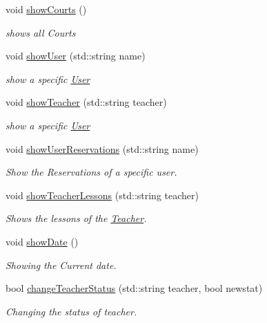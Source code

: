 \begin{DoxyCompactItemize}
void \mbox{\hyperlink{class_company_a1779c78bdc9a4416a482be25b71efcd0}{show\+Courts}} ()
\begin{DoxyCompactList}\small\item\em shows all Courts \end{DoxyCompactList}\item 
void \mbox{\hyperlink{class_company_a664aa9b9bde35eae3a564edec73cf5b3}{show\+User}} (std\+::string name)
\begin{DoxyCompactList}\small\item\em show a specific \mbox{\hyperlink{class_user}{User}} \end{DoxyCompactList}\item 
void \mbox{\hyperlink{class_company_aa64ff74648761cfe39d4a9fb0c72031f}{show\+Teacher}} (std\+::string teacher)
\begin{DoxyCompactList}\small\item\em show a specific \mbox{\hyperlink{class_user}{User}} \end{DoxyCompactList}\item 
void \mbox{\hyperlink{class_company_a428b70dbf9acd5edb34ee131ff1f8613}{show\+User\+Reservations}} (std\+::string name)
\begin{DoxyCompactList}\small\item\em Show the Reservations of a specific user. \end{DoxyCompactList}\item 
void \mbox{\hyperlink{class_company_aef95f2feab286505091c38db23cd1c90}{show\+Teacher\+Lessons}} (std\+::string teacher)
\begin{DoxyCompactList}\small\item\em Shows the lessons of the \mbox{\hyperlink{class_teacher}{Teacher}}. \end{DoxyCompactList}\item 
\mbox{\label{class_company_ad5477594a7c735a070c9076192d0bfe1}} 
void \mbox{\hyperlink{class_company_ad5477594a7c735a070c9076192d0bfe1}{show\+Date}} ()
\begin{DoxyCompactList}\small\item\em Showing the Current date. \end{DoxyCompactList}\item 
bool \mbox{\hyperlink{class_company_a6ab661c94b41a0b6ef74fec280bf849e}{change\+Teacher\+Status}} (std\+::string teacher, bool newstat)
\begin{DoxyCompactList}\small\item\em Changing the status of teacher. \end{DoxyCompactList}\item 

\end{DoxyCompactItemize}
